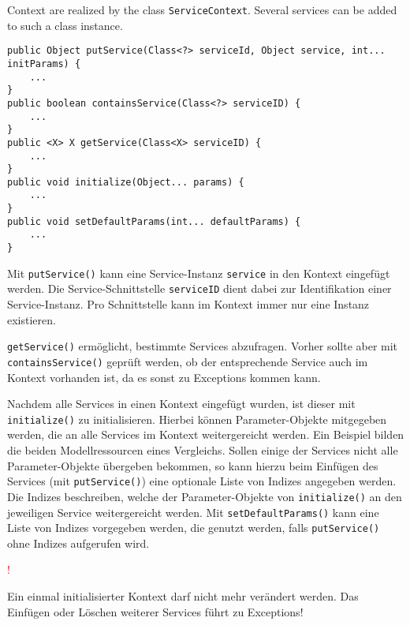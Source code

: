 \documentclass[10pt,a4paper]{scrartcl}
\newcommand{\hinweis}[1]{
\begin{framed}
\begin{minipage}[t]{0.02\textwidth}
\textcolor{red}{\Huge{\sffamily !}}
\end{minipage}
\begin{minipage}[t]{0.94\textwidth}
#1
\end{minipage}
\end{framed}
}
\providecommand{\deutsch}[1]{#1}
\providecommand{\englisch}[1]{{\sffamily #1}}
\begin{document}
\englisch{Context are realized by the class \texttt{ServiceContext}. Several 
services can be added to such a class instance.}

\begin{lstlisting}
public Object putService(Class<?> serviceId, Object service, int... initParams) {
	...
}
public boolean containsService(Class<?> serviceID) {
	...
}
public <X> X getService(Class<X> serviceID) {
	...
}
public void initialize(Object... params) {
	...
}
public void setDefaultParams(int... defaultParams) {
	...
}
\end{lstlisting}

\deutsch{Mit \texttt{putService()} kann eine Service-Instanz \texttt{service} in den
Kontext eingefügt werden. Die Service-Schnittstelle \texttt{serviceID} dient
dabei zur Identifikation einer Service-Instanz. Pro Schnittstelle kann im
Kontext immer nur eine Instanz existieren. 

\texttt{getService()} ermöglicht, bestimmte Services abzufragen. Vorher sollte
aber mit \texttt{containsService()} geprüft werden, ob der entsprechende Service
auch im Kontext vorhanden ist, da es sonst zu Exceptions kommen kann.

Nachdem alle Services in einen Kontext eingefügt wurden, ist dieser mit 
\texttt{initialize()} zu initialisieren. Hierbei können Parameter-Objekte 
mitgegeben werden, die an alle Services im Kontext weitergereicht werden. Ein
Beispiel bilden die beiden Modellressourcen eines Vergleichs. Sollen einige der
Services nicht alle Parameter-Objekte übergeben bekommen, so kann hierzu beim
Einfügen des Services (mit \texttt{putService()}) eine optionale Liste von 
Indizes angegeben werden. Die Indizes beschreiben, welche der Parameter-Objekte
von \texttt{initialize()} an den jeweiligen Service weitergereicht werden. Mit
\texttt{setDefaultParams()} kann eine Liste von Indizes vorgegeben werden, die
genutzt werden, falls \texttt{putService()} ohne Indizes aufgerufen wird.

\hinweis{Ein einmal initialisierter Kontext darf nicht mehr verändert werden.
Das Einfügen oder Löschen weiterer Services führt zu Exceptions!}}
\end{document}
